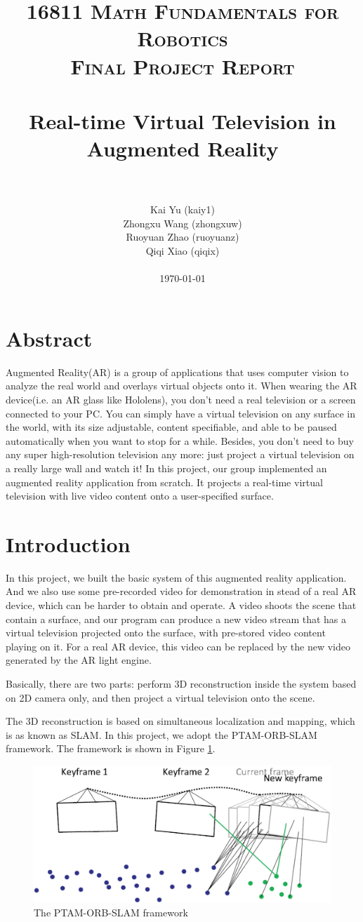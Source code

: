 \documentclass[paper=a4, fontsize=14pt]{scrartcl}
\title{
		\usefont{OT1}{bch}{b}{n}
		\normalfont \normalsize \textsc{16811 Math Fundamentals for Robotics\\
        Final Project Report} \\ [25pt]
		\horrule{0.5pt} \\[0.4cm]
		\huge Real-time Virtual Television in Augmented Reality \\
		\horrule{2pt} \\[0.5cm]
}
\author{
		\normalfont
        Kai Yu (kaiy1)\\
    	Zhongxu Wang (zhongxuw)\\
    	Ruoyuan Zhao (ruoyuanz)\\
    	Qiqi Xiao (qiqix)\\[-3pt]		
        \\
        \normalsize
        \today
}
\date{}
\numberwithin{equation}{section}		%
\numberwithin{figure}{section}			%
\numberwithin{table}{section}				%
\begin{document}
\maketitle
\newpage
\section{Abstract}

Augmented Reality(AR) is a group of applications that uses computer vision to analyze the real world and overlays virtual objects onto it. 
When wearing the AR device(i.e. an AR glass like Hololens), you don't need a real television or a screen connected to your PC. 
You can simply have a virtual television on any surface in the world, with its size adjustable, content specifiable, and able to be paused automatically when you want to stop for a while.
Besides, you don't need to buy any super high-resolution television any more: just project a virtual television on a really large wall and watch it!
In this project, our group implemented an augmented reality application from scratch. 
It projects a real-time virtual television with live video content onto a user-specified surface. 

\newpage
\section{Introduction}\label{intro}
In this project, we built the basic system of this augmented reality application.
And we also use some pre-recorded video for demonstration in stead of a real AR device, which can be harder to obtain and operate. 
A video shoots the scene that contain a surface, and our program can produce a new video stream that has a virtual television projected onto the surface, with pre-stored video content playing on it.
For a real AR device, this video can be replaced by the new video generated by the AR light engine.

Basically, there are two parts: perform 3D reconstruction inside the system based on 2D camera only, and then project a virtual television onto the scene. 

The 3D reconstruction is based on simultaneous localization and mapping, which is as known as SLAM. In this project, we adopt the PTAM-ORB-SLAM framework\cite{mur2015orb}. 
The framework is shown in Figure \ref{fig:framework}.

\begin{figure}[h]
	\centering
	\includegraphics[width=.80\linewidth]{images/framework.png}
	\caption{The PTAM-ORB-SLAM framework}
	\label{fig:framework}
\end{figure}
\end{document}
